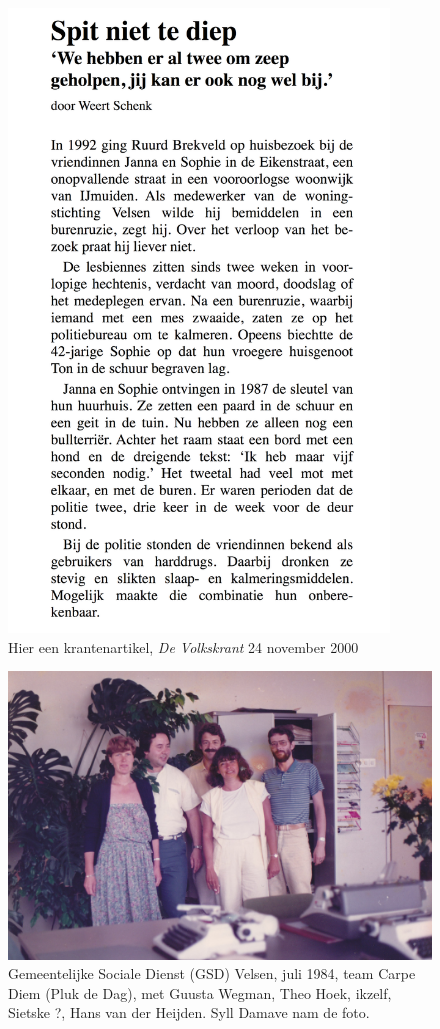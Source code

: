 \documentclass[12pt,twoside, openright]{memoir}
\begin{document}
\begin{figure}
\centering
\includegraphics[width=0.9\textwidth]{img/ch46/krant}
\caption*{\footnotesize Hier een krantenartikel, \emph{De Volkskrant} 24 november 2000}
\end{figure}

\begin{figure}
\centering
\includegraphics[width=\textwidth]{img/ch46/crew}
\caption*{\footnotesize Gemeentelijke Sociale Dienst (GSD) Velsen, juli 1984, team Carpe Diem (Pluk de Dag), met Guusta Wegman, Theo Hoek, ikzelf, Sietske ?, Hans van der Heijden. Syll Damave nam de foto.}
\end{figure}
\end{document}
